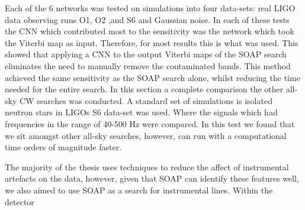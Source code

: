 Each of the 6 networks was tested on simulations into four data-sets: real \gls{LIGO} data observing runs O1, O2 ,and S6 and Gaussian noise.
In each of these tests the \gls{CNN} which contributed most to the sensitivity was the network which took the Viterbi map as input.
Therefore, for most results this is what was used. 
This showed that applying a \gls{CNN} to the output Viterbi maps of the SOAP search eliminates the need to manually remove the contaminated bands.
This method achieved the same sensitivity as the SOAP search alone, whilst reducing the time needed for the entire search.
In this section a complete comparison the other all-sky \gls{CW} searches was conducted.
A standard set of simulations is isolated neutron stars in \glspl{LIGO} S6 data-set was used.
Where the signals which had frequencies in the range of 40-500 Hz were compared. 
In this test we found that we sit amongst other all-sky searches, however, can run with a computational time orders of magnitude faster.

\bigskip

The majority of the thesis uses techniques to reduce the affect of instrumental artefacts on the data, however, given that SOAP can identify these features well, we also aimed to use SOAP as a search for instrumental lines.
Within the detector 











